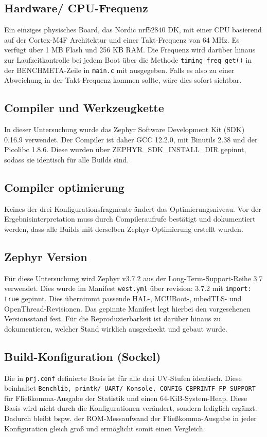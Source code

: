 \subsection{Hardware/ CPU-Frequenz}
Ein einziges physisches Board, das Nordic nrf52840 DK, mit einer CPU basierend auf der Cortex-M4F Architektur und einer Takt-Frequenz von 64 MHz. Es verf{\"u}gt {\"u}ber 1 MB Flash und 256 KB RAM. Die Frequenz wird dar{\"u}ber hinaus zur Laufzeitkontrolle bei jedem Boot {\"u}ber die Methode \lstinline[style=codeinline]|timing_freq_get()| in der BENCHMETA-Zeile in \lstinline[style=codeinline]|main.c| mit ausgegeben. Falls es also zu einer Abweichung in der Takt-Frequenz kommen sollte, w{\"a}re dies sofort sichtbar.

\subsection{Compiler und Werkzeugkette}
In dieser Untersuchung wurde das Zephyr Software Development Kit (SDK) 0.16.9 verwendet. Der Compiler ist daher GCC 12.2.0, mit Binutils 2.38 und der Picolibc 1.8.6. Diese wurden {\"u}ber ZEPHYR\_SDK\_INSTALL\_DIR gepinnt, sodass sie identisch f{\"u}r alle Builds sind.

\subsection{Compiler optimierung}
Keines der drei Konfigurationsfragmente {\"a}ndert das Optimierungsniveau. Vor der Ergebnisinterpretation muss durch Compileraufrufe best{\"a}tigt und dokumentiert werden, dass alle Builds mit derselben Zephyr-Optimierung erstellt wurden.

\subsection{Zephyr Version}
F{\"u}r diese Untersuchung wird Zephyr v3.7.2 aus der Long-Term-Support-Reihe 3.7 verwendet. Dies wurde im Manifest \lstinline[style=codeinline]|west.yml| {\"u}ber revision: 3.7.2 mit \lstinline[style=codeinline]|import: true| gepinnt. Dies {\"u}bernimmt passende HAL-, MCUBoot-, mbedTLS- und OpenThread-Revisionen. Das gepinnte Manifest legt hierbei den vorgesehenen Versionsstand fest. F{\"u}r die Reproduzierbarkeit ist dar{\"u}ber hinaus zu dokumentieren, welcher Stand wirklich ausgecheckt und gebaut wurde.

\subsection{Build-Konfiguration (Sockel)}
Die in \lstinline[style=codeinline]|prj.conf| definierte Basis ist f{\"u}r alle drei UV-Stufen identisch. Diese beinhaltet \lstinline[style=codeinline]|Benchlib, printk/ UART/ Konsole, CONFIG_CBPRINTF_FP_SUPPORT| f{\"u}r Flie{\ss}komma-Ausgabe der Statistik und einen 64-KiB-System-Heap. Diese Basis wird nicht durch die Konfigurationen ver{\"a}ndert, sondern lediglich erg{\"a}nzt. Dadurch bleibt bspw. der ROM-Messaufwand der Flie{\ss}komma-Ausgabe in jeder Konfiguration gleich gro{\ss} und erm{\"o}glicht somit einen Vergleich.

